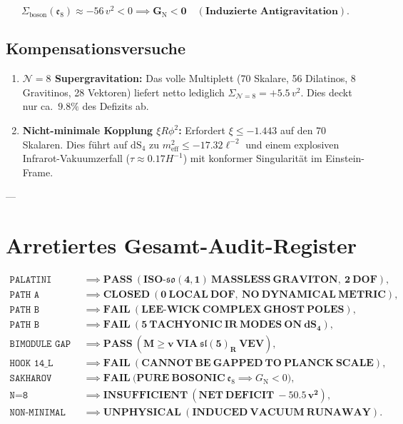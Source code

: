 \documentclass[11pt,a4paper]{article}
\begin{document}
\begin{equation}
\Sigma_{\mathrm{boson}}(\mathfrak{e}_8) \approx -56\,v^2 < 0 \implies \mathbf{G_{\mathrm{N}} < 0 \quad (\text{Induzierte Antigravitation})}.
\end{equation}

\subsection{Kompensationsversuche}
\begin{enumerate}
    \item \textbf{$\mathcal{N}=8$ Supergravitation:} Das volle Multiplett (70 Skalare, 56 Dilatinos, 8 Gravitinos, 28 Vektoren) liefert netto lediglich $\Sigma_{\mathcal{N}=8} = +5.5\,v^2$. Dies deckt nur ca.~$9.8\%$ des Defizits ab.
    \item \textbf{Nicht-minimale Kopplung $\xi R \phi^2$:} Erfordert $\xi \le -1.443$ auf den 70 Skalaren. Dies führt auf $\mathrm{dS}_4$ zu $m_{\mathrm{eff}}^2 \le -17.32\ell^{-2}$ und einem explosiven Infrarot-Vakuumzerfall ($\tau \approx 0.17 H^{-1}$) mit konformer Singularität im Einstein-Frame.
\end{enumerate}

---

\section{Arretiertes Gesamt-Audit-Register}

\begin{auditbox}
\begin{align*}
\texttt{PALATINI GRAVITY GATE} &\implies \mathbf{PASS\ (ISO\text{-}\mathfrak{so}(4,1)\ MASSLESS\ GRAVITON,\ 2\ DOF)},\\
\texttt{PATH A (TOPOLOGICAL)} &\implies \mathbf{CLOSED\ (0\ LOCAL\ DOF,\ NO\ DYNAMICAL\ METRIC)},\\
\texttt{PATH B (CARTAN 56D)} &\implies \mathbf{FAIL\ (LEE\text{-}WICK\ COMPLEX\ GHOST\ POLES)},\\
\texttt{PATH B (LORENTZ 56D)} &\implies \mathbf{FAIL\ (5\ TACHYONIC\ IR\ MODES\ ON\ dS_4)},\\
\texttt{BIMODULE GAP (200)} &\implies \mathbf{PASS\ (M \ge v\ VIA\ \mathfrak{sl}(5)_R\ VEV)},\\
\texttt{HOOK 14\_L PROTECTION} &\implies \mathbf{FAIL\ (CANNOT\ BE\ GAPPED\ TO\ PLANCK\ SCALE)},\\
\texttt{SAKHAROV POSITIVITY} &\implies \mathbf{FAIL\ (PURE\ BOSONIC\ } \mathfrak{e}_8 \implies G_{\mathrm{N}} < 0\mathbf{)},\\
\texttt{N=8 COMPENSATION} &\implies \mathbf{INSUFFICIENT\ (NET\ DEFICIT\ -50.5\,v^2)},\\
\texttt{NON-MINIMAL RETRIEVAL} &\implies \mathbf{UNPHYSICAL\ (INDUCED\ VACUUM\ RUNAWAY)}.
\end{align*}
\end{auditbox}
\end{document}

